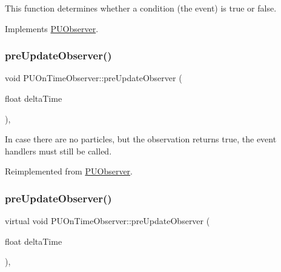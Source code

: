This function determines whether a condition (the event) is true or false. 

Implements \hyperlink{classPUObserver_a50f59cc3245e291b641463db5d3037f7}{P\+U\+Observer}.

\mbox{\label{classPUOnTimeObserver_a550ca101b37fc1969fff0997cb45373e}} 
\subsubsection{\texorpdfstring{pre\+Update\+Observer()}{preUpdateObserver()}\hspace{0.1cm}{\footnotesize\ttfamily [1/2]}}
{\footnotesize\ttfamily void P\+U\+On\+Time\+Observer\+::pre\+Update\+Observer (\begin{DoxyParamCaption}\item[{float}]{delta\+Time }\end{DoxyParamCaption})\hspace{0.3cm}{\ttfamily [override]}, {\ttfamily [virtual]}}

In case there are no particles, but the observation returns true, the event handlers must still be called. 

Reimplemented from \hyperlink{classPUObserver}{P\+U\+Observer}.

\mbox{\label{classPUOnTimeObserver_a4d17ab0ea123c3ad295b5fac1e9ff574}} 
\subsubsection{\texorpdfstring{pre\+Update\+Observer()}{preUpdateObserver()}\hspace{0.1cm}{\footnotesize\ttfamily [2/2]}}
{\footnotesize\ttfamily virtual void P\+U\+On\+Time\+Observer\+::pre\+Update\+Observer (\begin{DoxyParamCaption}\item[{float}]{delta\+Time }\end{DoxyParamCaption})\hspace{0.3cm}{\ttfamily [override]}, {\ttfamily [virtual]}}


